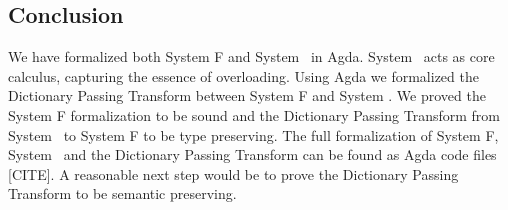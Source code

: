 \subsection{Conclusion}
We have formalized both System F and System \Fo\ in Agda. 
System \Fo\ acts as core calculus, capturing the essence of overloading.
Using Agda we formalized the Dictionary Passing Transform between System F and System \Fo. 
We proved the System F formalization to be sound and the Dictionary Passing Transform from System \Fo\ to System F to be type preserving. The full formalization of System F, System \Fo\ and the Dictionary Passing Transform can be found as Agda code files [CITE].
A reasonable next step would be to prove the Dictionary Passing Transform to be semantic preserving. 